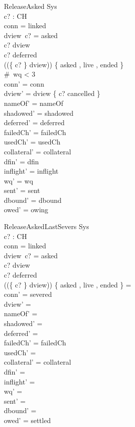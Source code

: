 \documentclass[a4paper,10pt,fleqn]{article}
\begin{document}
\begin{schema}{ReleaseAsked}
  \Delta Sys \\
  c? : CH \\
\where
  conn = linked \\
  dview~c? = asked \\
  c? \in \dom dview \\
  c? \notin deferred \\
  (\ran (\{ c? \} \ndres dview)) \cap \{ asked , live , ended \} \neq \emptyset \\
  \#~wq < 3 \\
  conn' = conn \\
  dview' = dview \oplus \{ c? \mapsto cancelled \} \\
  nameOf' = nameOf \\
  shadowed' = shadowed \\
  deferred' = deferred \\
  failedCh' = failedCh \\
  usedCh' = usedCh \\
  collateral' = collateral \\
  dfin' = dfin \\
  inflight' = inflight \\
  wq' = wq \\
  sent' = sent \\
  dbound' = dbound \\
  owed' = owing
\end{schema}

\begin{schema}{ReleaseAskedLastSevers}
  \Delta Sys \\
  c? : CH \\
\where
  conn = linked \\
  dview~c? = asked \\
  c? \in \dom dview \\
  c? \notin deferred \\
  (\ran (\{ c? \} \ndres dview)) \cap \{ asked , live , ended \} = \emptyset \\
  conn' = severed \\
  dview' = \emptyset \\
  nameOf' = \emptyset \\
  shadowed' = \emptyset \\
  deferred' = \emptyset \\
  failedCh' = failedCh \\
  usedCh' = \emptyset \\
  collateral' = collateral \\
  dfin' = \emptyset \\
  inflight' = \langle \rangle \\
  wq' = \langle \rangle \\
  sent' = \langle \rangle \\
  dbound' = \emptyset \\
  owed' = settled
\end{schema}
\end{document}
